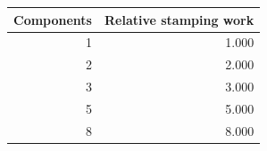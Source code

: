 \begin{tabular}{rr}
\toprule
Components & Relative stamping work \\
\midrule
1 & 1.000 \\
2 & 2.000 \\
3 & 3.000 \\
5 & 5.000 \\
8 & 8.000 \\
\bottomrule
\end{tabular}
